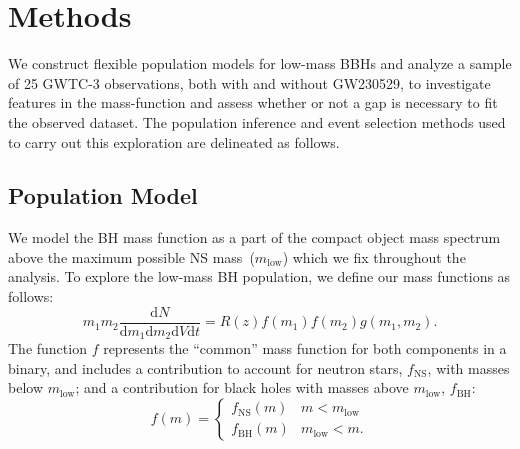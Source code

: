 \documentclass[modern]{aastex631}
\newcommand{\dd}{\ensuremath{\mathrm{d}}}
\begin{document}
\section{Methods}
\label{sec:methods}
\noindent
We construct flexible population models for low-mass BBHs and analyze a sample of 25 GWTC-3 observations, both with and without GW230529, to investigate features in the mass-function and assess whether or not a gap is necessary to fit the observed dataset. The population inference and event selection methods used to carry out this exploration are delineated as follows.
\subsection{Population Model}
\noindent
{}  We model the BH mass function as a part of the
compact object mass spectrum above the maximum possible NS
mass~($m_\mathrm{low}$) which we fix throughout the analysis. To explore the
low-mass BH population, we define our mass functions as follows:
\begin{equation}
    \label{eq:intensity-definition}
    m_1 m_2 \frac{\dd N}{\dd m_1 \dd m_2 \dd V \dd t} = R(z) f\left( m_1 \right) f\left( m_2 \right) g(m_1, m_2).
\end{equation}
\noindent
The function $f$ represents the ``common'' mass function for both components in
a binary, and includes a contribution to account for neutron stars,
$f_\mathrm{NS}$, with masses below $m_\mathrm{low}$; and a contribution for
black holes with masses above $m_\mathrm{low}$, $f_\mathrm{BH}$:
\begin{equation}
    f(m) = \begin{cases}
        f_\mathrm{NS}(m) & m < m_\mathrm{low} \\
        f_\mathrm{BH}(m) & m_\mathrm{low} < m.
    \end{cases}
\end{equation}
\end{document}
